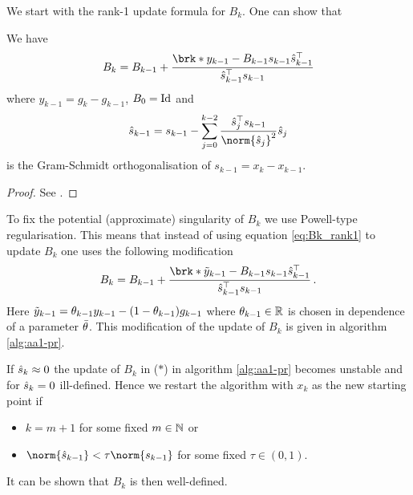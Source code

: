 	
We start with the rank-1 update formula for $B_k$. One can show that
\begin{proposition}
	We have
	\begin{align}
		B_{k} = B_{k-1}+\frac{\brk*{y_{k-1}-B_{k-1}s_{k-1}}\hs_{k-1}^\top}{\hs_{k-1}^\top s_{k-1}}\label{eq:Bk_rank1}
	\end{align}
	where $y_{k-1} = g_{k}-g_{k-1}$, $B_0=\operatorname{Id}$ and
	\begin{align*}
		\hs_{k-1} = s_{k-1}-\sum_{j=0}^{k-2}\frac{\hs_j^\top s_{k-1}}{\norm{\hs_j}^2}\hs_j
	\end{align*}
	is the Gram-Schmidt orthogonalisation of $s_{k-1}=x_{k}-x_{k-1}$.
\end{proposition}
\begin{proof}
	See \cite{ZhaAA}.
\end{proof}
To fix the potential (approximate) singularity of $B_k$ we use Powell-type regularisation. This means that instead of using equation \ref{eq:Bk_rank1} to update $B_k$ one uses the following modification
\begin{align*}
		B_{k} = B_{k-1}+\frac{\brk*{\tiy_{k-1}-B_{k-1}s_{k-1}}\hs_{k-1}^\top}{\hs_{k-1}^\top s_{k-1}}\,.
\end{align*}
Here $\tilde{y}_{k-1}=\theta_{k-1}y_{k-1}-(1-\theta_{k-1})g_{k-1}$ where $\theta_{k-1}\in\mathbb{R}$ is chosen in dependence of a parameter $\bar{\theta}$.
This modification of the update of $B_k$ is given in algorithm \ref{alg:aa1-pr}.

If $\hat{s}_k\approx 0$ the update of $B_k$ in ($*$) in algorithm \ref{alg:aa1-pr} becomes unstable and for $\hat{s}_k=0$ ill-defined.
Hence we restart the algorithm with $x_k$ as the new starting point if
\begin{itemize}
	\item $k=m+1$ for some fixed $m\in\mathbb{N}$ or
	\item $\norm{\hs_{k-1}}<\tau\norm{s_{k-1}}$ for some fixed $\tau\in(0,1)$.
\end{itemize}
It can be shown that $B_k$ is then well-defined.

